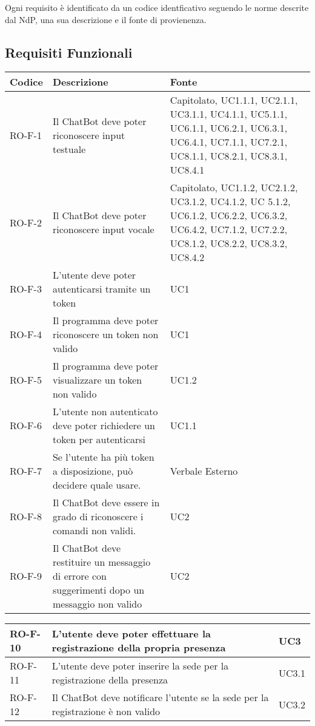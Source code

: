 Ogni requisito è identificato da un codice identficativo seguendo le norme descrite dal NdP, una sua descrizione e il fonte di provienenza.
\subsection{Requisiti Funzionali}
\begin{center}
\renewcommand{\arraystretch}{1.8} %
\begin{tabular}{ | m{8em} | m{18em} | m{12em} | }
\hline
Codice&Descrizione&Fonte\\
\hline
RO-F-1 & Il ChatBot deve poter riconoscere input testuale & Capitolato, UC1.1.1, UC2.1.1, UC3.1.1, UC4.1.1, UC5.1.1, UC6.1.1, UC6.2.1, UC6.3.1, UC6.4.1, UC7.1.1, UC7.2.1, UC8.1.1, UC8.2.1,  UC8.3.1, UC8.4.1\\
\hline
RO-F-2&Il ChatBot deve poter riconoscere input vocale&Capitolato, UC1.1.2, UC2.1.2, UC3.1.2, UC4.1.2, UC 5.1.2, UC6.1.2, UC6.2.2, UC6.3.2, UC6.4.2, UC7.1.2, UC7.2.2, UC8.1.2, UC8.2.2,  UC8.3.2, UC8.4.2\\
\hline
RO-F-3&L’utente deve poter autenticarsi tramite un token&UC1\\
\hline
RO-F-4&Il programma deve poter riconoscere un token non valido&UC1\\
\hline
RO-F-5&Il programma deve poter visualizzare un token non valido&UC1.2\\
\hline
RO-F-6&L’utente non autenticato deve poter richiedere un token per autenticarsi&UC1.1\\
\hline
RO-F-7&Se l’utente ha più token a disposizione, può decidere quale usare.&Verbale Esterno\\
\hline
RO-F-8&Il ChatBot deve essere in grado di riconoscere i comandi non validi.&UC2\\
\hline
RO-F-9&Il ChatBot deve restituire un messaggio di errore con suggerimenti dopo un messaggio non valido &UC2 \\
\hline
\end{tabular}
\newpage
\begin{tabular}{ | m{8em} | m{18em} | m{12em} | }
\hline
RO-F-10&L’utente deve poter effettuare la registrazione della propria presenza &UC3 \\
\hline
RO-F-11&L’utente deve poter inserire la sede per la registrazione della presenza &UC3.1 \\
\hline
RO-F-12&Il ChatBot deve notificare l’utente se la sede per la registrazione è non valido &UC3.2 \\

\end{tabular}
\end{center}
